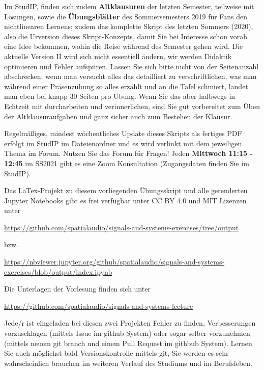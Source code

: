 %
Im StudIP, finden sich zudem \textbf{Altklausuren} der letzten Semester,
teilweise mit Lösungen, sowie die \textbf{Übungsblätter} des Sommersemesters
2019 für Fans den nichtlinearen Lernens;
%
zudem das komplette Skript des letzten Sommers (2020), also die Urversion
dieses Skript-Konzepts, damit Sie bei Interesse schon vorab eine Idee bekommen,
wohin die Reise während des Semester gehen wird.
%
Die aktuelle Version II wird sich nicht essentiell ändern, wir werden
Didaktik optimieren und Fehler aufspüren.
%
Lassen Sie sich bitte nicht von der Seitenanzahl abschrecken:
%
wenn man versucht alles das detailliert zu verschriftlichen, was man während einer
Präsenzübung so alles erzählt und an die Tafel schmiert, landet man eben bei
knapp 30 Seiten pro Übung.
%
Wenn Sie das aber halbwegs in Echtzeit mit durcharbeiten und verinnerlichen,
sind Sie gut vorbereitet zum Üben der Altklausuraufgaben und ganz sicher auch
zum Bestehen der Klausur.

Regelmäßiges, mindest wöchentliches Update dieses Skripts als fertiges PDF
erfolgt im StudIP im Dateienordner und es wird verlinkt mit dem jeweiligen Thema
im Forum.
%
Nutzen Sie das Forum für Fragen!
%
Jeden \textbf{Mittwoch 11:15 - 12:45} im SS2021 gibt es eine Zoom Konsultation
(Zugangsdaten finden Sie im StudIP).

\newpage
Das LaTex-Projekt zu diesem vorliegenden Übungsskript und alle gerenderten Jupyter
Notebooks gibt es frei verfügbar unter CC BY 4.0 und MIT Lizenzen unter
\begin{mdframed}[backgroundcolor=C2!10]
\url{https://github.com/spatialaudio/signals-and-systems-exercises/tree/output}
\end{mdframed}
bzw.
\begin{mdframed}[backgroundcolor=C2!10]
\url{https://nbviewer.jupyter.org/github/spatialaudio/signals-and-systems-exercises/blob/output/index.ipynb}
\end{mdframed}
%

%
Die Unterlagen der Vorlesung finden sich unter
\begin{mdframed}[backgroundcolor=C2!10]
\url{https://github.com/spatialaudio/signals-and-systems-lecture}
\end{mdframed}
%
Jede/r ist eingeladen bei diesen zwei Projekten Fehler zu finden, Verbesserungen
vorzuschlagen (mittels Issue im github System) oder sogar selber vorzunehmen
(mittels neuem git branch und einem Pull Request im githbub System).
%
Lernen Sie auch möglichst bald Versionskontrolle mittels git, Sie werden es sehr
wahrscheinlich brauchen im weiteren Verlauf des Studiums und im Berufsleben.

